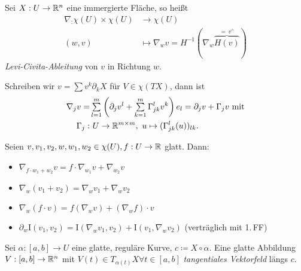\documentclass{cheat-sheet}
\newcommand{\I}{\mathrm{I}}
\begin{document}
\begin{defn}
  Sei $X : U \to \mathbb{R}^n$ eine immergierte Fläche, so heißt
  \begin{align*}
    \nabla_ : \chi(U) \times \chi(U) &\to \chi(U) \\[-12pt]
    (w, v) &\mapsto \nabla_w v = H^{-1}(\nabla_w \overbrace{H(v)}^{=\,v^\wedge})
  \end{align*}
  \emph{Levi-Civita-Ableitung} von $v$ in Richtung $w$.
\end{defn}

\begin{bem}
  Schreiben wir $v = \sum v^k \partial_k X$ für $V \in \chi(TX)$, dann ist
  \begin{align*}
    \nabla_j v =& \sum_{l=1}^m \left( \partial_j v^l + \sum_{k=1}^m \Gamma_{jk}^l v^k \right) e_l = \partial_j v + \Gamma_j v \text{ mit}\\
    \Gamma_j :& \,\, U \to \R^{m \times m}, \,\, u \mapsto (\Gamma_{jk}^l(u))_{lk}.
  \end{align*}
\end{bem}

\begin{satz}
  Seien $v, v_1, v_2, w, w_1, w_2 \in \chi(U), f : U \to \mathbb{R}$ glatt. Dann:
  \begin{itemize}
    \item $\nabla_{f \cdot w_1 + w_2} v = f \cdot \nabla_{w_1} v + \nabla_{w_2} v$
    \item $\nabla_w (v_1 + v_2) = \nabla_w v_1 + \nabla_w v_2$
    \item $\nabla_w (f \cdot v) = f (\nabla_w v) + (\nabla_w f) \cdot v$
    \item $\partial_w \I(v_1, v_2) = \I(\nabla_w v_1, v_2) + \I(v_1, \nabla_w v_2)$ (verträglich mit 1.\,FF)
  \end{itemize}
\end{satz}



\begin{defn}
  Sei $\alpha : [a, b] \to U$ eine glatte, reguläre Kurve, $c \coloneqq X \circ \alpha$. Eine glatte Abbildung $V : [a, b] \to \mathbb{R}^n$ mit $V(t) \in T_{\alpha(t)} X \forall t \in [a, b]$ \emph{tangentiales Vektorfeld} längs $c$.
\end{defn}
\end{document}
